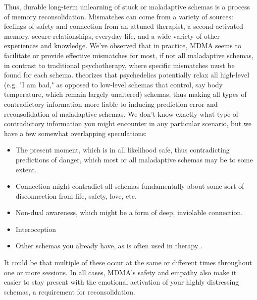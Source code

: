 \documentclass[12pt,letterpaper]{book}
\begin{document}
Thus, durable long-term unlearning of stuck or maladaptive schemas is a process of memory reconsolidation. Mismatches can come from a variety of sources: feelings of safety and connection from an attuned therapist, a second activated memory, secure relationships, everyday life, and a wide variety of other experiences and knowledge. We've observed that in practice, MDMA seems to facilitate or provide effective mismatches for most, if not all maladaptive schemas, in contrast to traditional psychotherapy, where specific mismatches must be found for each schema. \textcite{carhart2019rebus} theorizes that psychedelics potentially relax all high-level (e.g. "I am bad," as opposed to low-level schemas that control, say body temperature, which remain largely unaltered) schemas, thus making all types of contradictory information more liable to inducing prediction error and reconsolidation of maladaptive schemas. We don't know exactly what type of contradictory information you might encounter in any particular scenario, but we have a few somewhat overlapping speculations:
\begin{itemize}
	\item The present moment, which is in all likelihood safe, thus contradicting predictions of danger, which most or all maladaptive schemas may be to some extent.
	\item Connection might contradict all schemas fundamentally about some sort of disconnection from life, safety, love, etc.
	\item Non-dual awareness, which might be a form of deep, inviolable connection.
	\item Interoception \cite{carhart2019rebus}
	\item Other schemas you already have, as is often used in therapy \cite{eckerUnlocking}. 
\end{itemize}
It could be that multiple of these occur at the same or different times throughout one or more sessions. In all cases, MDMA's safety and empathy also make it easier to stay present with the emotional activation of your highly distressing schemas, a requirement for reconsolidation.
\end{document}
